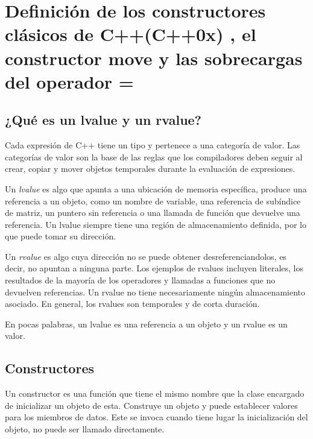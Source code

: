 \documentclass[10pt]{article}
\begin{document}
\vspace{2em}
\section{Definici\'on de  los constructores clásicos de C++(C++0x) , el constructor move y las sobrecargas del operador =}

\subsection{¿Qué es un lvalue y un rvalue?}

Cada expresión de C++ tiene un tipo y pertenece a una categoría de valor. Las categorías de valor son la base de las reglas que los compiladores deben seguir al crear, copiar y mover objetos temporales durante la evaluación de expresiones.

Un \textit{lvalue} es algo que apunta a una ubicación de memoria específica, produce una referencia a un objeto, como un nombre de variable, una referencia de subíndice de matriz, un puntero sin referencia o una llamada de función que devuelve una referencia. Un lvalue siempre tiene una región de almacenamiento definida, por lo que puede tomar su dirección.

Un \textit{rvalue} es algo cuya dirección no se puede obtener desreferenciandolos, es decir, no apuntan a ninguna parte. Los ejemplos de rvalues incluyen literales, los resultados de la mayoría de los operadores y llamadas a funciones que no devuelven referencias. Un rvalue no tiene necesariamente ningún almacenamiento asociado. En general, los rvalues son temporales y de corta duración.

En pocas palabras, un lvalue es una referencia a un objeto y un rvalue es un valor. 

\subsection{Constructores}

Un constructor es una función que tiene el mismo nombre que la clase encargado de inicializar un objeto de esta. Construye un objeto y puede establecer valores para los miembros de datos. Este se invoca cuando tiene lugar la inicialización del objeto, no puede ser llamado directamente.
\end{document}
